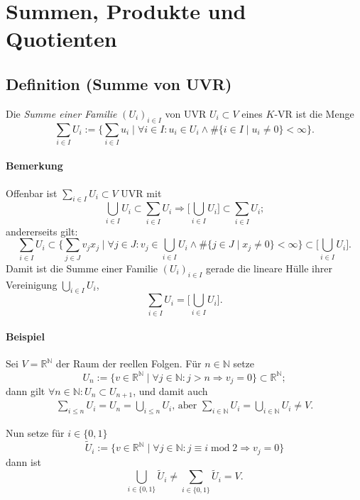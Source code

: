\section{Summen, Produkte und Quotienten}
\subsection{Definition (Summe von UVR)}
	\begin{Definition}
		Die \emph{Summe einer Familie} $ (U_i)_{i\in I} $ von UVR $ U_i\subset V $ eines $ K $-VR ist die Menge
		\[
		\sum_{i\in I} U_i := \Big\{\sum_{i \in I}u_i\mid \forall i\in I: u_i\in U_i \land \# \{i\in I\mid u_i \neq 0\}<\infty\Big\}.
		\]
	\end{Definition}
		
\paragraph{Bemerkung}
	Offenbar ist $ \sum_{i\in I} U_i\subset V $ UVR mit
	\[  \bigcup_{i\in I}U_i \subset \sum_{i\in I} U_i \Rightarrow \Big[\bigcup_{i\in I}U_i\Big]\subset \sum_{i\in I} U_i; \]
	andererseits gilt:
	\[ \sum_{i\in I}U_i \subset \Big\{\sum_{j\in J}v_jx_j\mid \forall j\in J: v_j\in \bigcup_{i\in I}U_i \land \#\{j\in J\mid x_j\neq 0\}<\infty\Big\}\subset \Big[\bigcup_{i\in I}U_i\Big]. \]
	Damit ist die Summe einer Familie $ (U_i)_{i\in I} $ gerade die lineare Hülle ihrer Vereinigung $ \bigcup_{i\in I}U_i $,
	\[ \sum_{i\in I}U_i= \Big[\bigcup_{i\in I}U_i\Big]. \]
		
\paragraph{Beispiel}
	Sei $ V=\mathbb{R}^\mathbb{N} $ der Raum der reellen Folgen. Für $ n\in \mathbb{N} $ setze
		\[
		U_n := \{v\in \mathbb{R}^\mathbb{N}\mid \forall j\in \mathbb{N}: j>n\Rightarrow v_j = 0 \} \subset \mathbb{R}^\mathbb{N};
		\]
	dann gilt $ \forall n\in \mathbb{N}: U_n\subset U_{n+1} $, und damit auch
		\begin{gather*}
		\sum_{i\leq n} U_i = U_n = \bigcup_{i\leq n}U_i \text{, aber } \sum_{i\in \mathbb{N}}U_i = \bigcup_{i\in \mathbb{N}}U_i \neq V.
		\end{gather*}
		
	Nun setze für $ i\in \{0,1\} $
		\[
		\tilde{U}_i := \{v\in \mathbb{R}^\mathbb{N}\mid \forall j\in \mathbb{N}: j\equiv
i\operatorname{mod} 2\Rightarrow v_j = 0\}
		\]
	dann ist 
		\[
		\bigcup_{i\in \{0,1\}}\tilde{U}_i \neq \sum_{i\in \{0,1\}}\tilde{U}_i = V.
		\]
		
